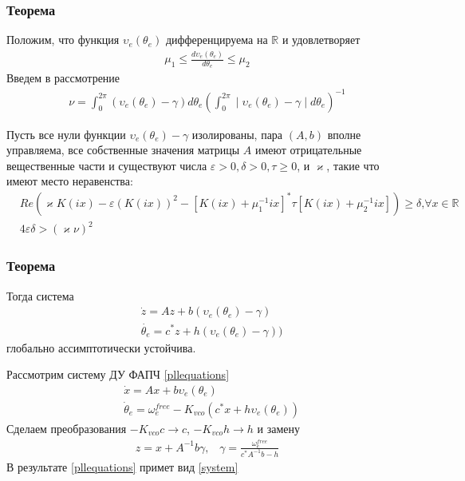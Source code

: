 \documentclass{beamer}
\begin{document}
\begin{frame}
\frametitle{Теорема}
Положим, что функция $\upsilon_e(\theta_e)$ дифференцируема на $\mathbb {R}$ и удовлетворяет
 \begin{equation}
 \begin{aligned}
\mu_1 \leq \frac{d\upsilon_e(\theta_e)}{d\theta_e} \leq \mu_2
 \end{aligned}
 \end{equation}
Введем в рассмотрение
  \begin{equation}
 \begin{aligned}
\nu = \int_{0}^{2\pi} (\upsilon_e(\theta_e) - \gamma) d\theta_e \left(\int_{0}^{2\pi} \mid \upsilon_e(\theta_e) - \gamma \mid d\theta_e\right)^{-1}
 \end{aligned}
\end{equation}
\begin{theorem}
Пусть все нули функции $\upsilon_e(\theta_e) - \gamma$ изолированы, пара $(A, b)$ вполне управляема, все собственные значения матрицы $A$ имеют отрицательные вещественные части и существуют числа $\varepsilon > 0, \delta > 0, \tau \geq 0$, и $\varkappa$, такие что имеют место неравенства:
 \begin{align*}
&Re(\varkappa K(ix)- \varepsilon(K(ix))^2-[K(ix)+\mu_1^{-1}ix]^*\tau[K(ix)+\mu_2^{-1}ix])\geq\delta\text{,}\forall x \in \mathbb{R}\label{first_th_eq}\\
&4\varepsilon\delta > (\varkappa\nu)^2
\end{align*}
\end{theorem}
\end{frame}

\begin{frame}
\frametitle{Теорема}
\begin{theorem}
Тогда система 
 \begin{equation}\label{system}
 \begin{aligned}
 &\dot{z} = Az + b(\upsilon_e(\theta_e) - \gamma) \\
 & \dot{\theta_e} = c^*z + h(\upsilon_e(\theta_e) - \gamma))
 \end{aligned}
\end{equation}
глобально ассимптотически устойчива.
\end{theorem}
Рассмотрим систему ДУ ФАПЧ \eqref{pllequations}
 \begin{equation*}
 \begin{aligned}
 &\dot{x} = Ax + b\upsilon_e(\theta_e) \\
 &\dot{\theta}_e = \omega_e^{free} - K_{vco}(c^*x + h\upsilon_e(\theta_e))
 \end{aligned}
\end{equation*}
Сделаем преобразования $-K_{vco}c \rightarrow c$, $-K_{vco}h \rightarrow h$ и замену
 \begin{equation}
 \begin{aligned}
 z = x + A^{-1}b\gamma  \text{,} \quad \gamma = \frac{\omega_e^{free}}{c^*A^{-1}b-h}
 \end{aligned}
\end{equation}
В результате \eqref{pllequations} примет вид \eqref{system}
\end{frame}
\end{document}
